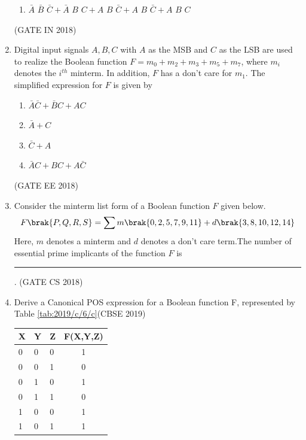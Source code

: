 \begin{enumerate}[label=\arabic*.,ref=\theenumi]
\begin{enumerate}
	  \item $\bar{A}\hspace{4pt}\bar{B}\hspace{4pt}\bar{C} + \bar{A}\hspace{4pt}B\hspace{4pt}C +A\hspace{4pt}B\hspace{4pt}\bar{C} + A\hspace{4pt}B\hspace{4pt}\bar{C}+ A\hspace{4pt}B\hspace{4pt}C$
\end{enumerate}
\hfill (GATE IN 2018)
\item Digital input signals $A, B, C$ with $A$ as the MSB and $C$ as the LSB are used to realize the Boolean function $F=m_0+m_2+m_3+m_5+m_7$, where $m_i$ denotes the $i^{th}$ minterm. In addition, $F$ has a don't care for $m_1$. The simplified expression for $F$ is given by 
\begin{enumerate}
    \item $\bar{A} \bar{C}+\bar{B} C+A C$
    \item$\bar{A}+C$
    \item$\bar{C}+A$ 
    \item$\bar{A} C+BC+A\bar{C}$
\end{enumerate}
\hfill (GATE EE 2018)
\item Consider the minterm list form of a Boolean function $F$ given below.
\begin{align*}
	F\brak{P,Q,R,S}=\sum m\brak{0,2,5,7,9,11}+d\brak{3,8,10,12,14}
\end{align*}
Here, $m$ denotes a minterm and $d$ denotes a don't care term.The number of essential prime implicants of the function $F$ is  \rule{1cm}{0.1pt}. 	
	\hfill (GATE CS 2018)
\item Derive a Canonical POS expression for a Boolean function F, represented by 
Table \ref{tab:2019/c/6/c}\hfill (CBSE 2019)
\label{prob:2019/c/6/c}
\begin{table}[H]
\centering
\begin{tabular}{|l|l|l|c|}
	\hline
	X&Y&Z&F(X,Y,Z)\\
	\hline
	0&0&0&1\\
	0&0&1&0\\
	0&1&0&1\\
	0&1&1&0\\
	1&0&0&1\\
	1&0&1&1\\

\end{tabular}
\end{table}
\end{enumerate}
